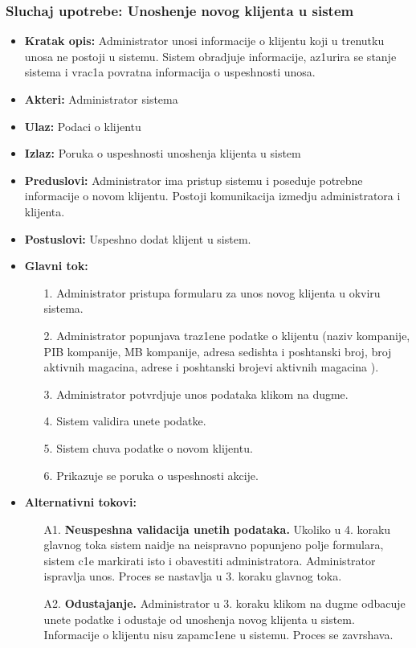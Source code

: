 \subsubsection{Sluchaj upotrebe: Unoshenje novog klijenta u sistem}
\begin{itemize}
\item{\textbf{Kratak opis:} Administrator unosi informacije o klijentu koji u trenutku unosa ne postoji u sistemu. Sistem obradjuje informacije, az1urira se stanje sistema i vrac1a povratna informacija o uspeshnosti unosa.}
\item{\textbf{Akteri:} Administrator sistema}
\item{\textbf{Ulaz:} Podaci o klijentu }
\item{\textbf{Izlaz:} Poruka o uspeshnosti unoshenja klijenta u sistem }
\item{\textbf{Preduslovi:} Administrator ima pristup sistemu i poseduje potrebne informacije o novom klijentu. Postoji komunikacija izmedju administratora i klijenta. }
\item{\textbf{Postuslovi:} Uspeshno dodat klijent u sistem.}
\item{\textbf{Glavni tok:} 
\begin{enumerate}
    \item [1.] Administrator pristupa formularu za unos novog klijenta u okviru sistema.
    \item[2.] Administrator popunjava traz1ene podatke o klijentu (naziv kompanije, PIB kompanije, MB kompanije, adresa sedishta i poshtanski broj, broj aktivnih magacina, adrese i poshtanski brojevi aktivnih magacina ).
    \item[3.] Administrator potvrdjuje unos podataka klikom na dugme.
    \item[4.] Sistem validira unete podatke.
    \item[5.] Sistem chuva podatke o novom klijentu.
    \item[6.] Prikazuje se poruka o uspeshnosti akcije.
\end{enumerate}

}
\item{\textbf{Alternativni tokovi:} 
\begin{enumerate}
    \item [A1.] \textbf{Neuspeshna validacija unetih podataka.} Ukoliko u 4. koraku glavnog toka sistem naidje na neispravno popunjeno polje formulara, sistem c1e markirati isto i obavestiti administratora. Administrator ispravlja unos. Proces se nastavlja u 3. koraku glavnog toka.
    \item[A2.] \textbf{Odustajanje.} Administrator u 3. koraku klikom na dugme odbacuje unete podatke i odustaje od unoshenja novog klijenta u sistem. Informacije o klijentu nisu zapamc1ene u sistemu. Proces se zavrshava.
\end{enumerate}
}
\end{itemize}

